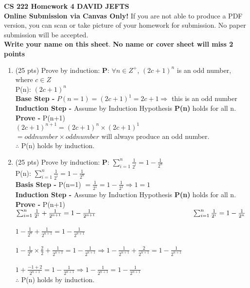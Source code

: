 \documentclass[11pt]{article}
\newcommand\tab[1][1cm]{\hspace*{#1}}
\begin{document}
{\Large {\bf CS 222 Homework 4   \tab\tab\tab\tab DAVID JEFTS}}\\

\noindent \textbf{Online Submission via Canvas Only!} If you are not able to produce a PDF version, you can scan or take picture of your homework for submission. No paper submission will be accepted.\\

\noindent \textbf{Write your name on this sheet}. \textbf{No name or cover sheet will miss 2 points}

\begin{enumerate}
  \item (25 pts) Prove by induction: {\bf P}: $\forall n \in Z^+$, $(2c+1)^n$ is an odd number, where $c \in Z$ \\
    \tab P(n): $(2c+1)^n$ \\
    \tab \textbf{Base Step -} $P(n=1) = (2c+1)^1 = 2c+1 \Rightarrow$ this is an odd number\\
    \tab \textbf{Induction Step -} Assume by Induction Hypothesis \textbf{P(n)} holds for all n.\\
    \tab \textbf{Prove -}  P(n+1) \\
    \tab\tab $(2c+1)^{n+1} = (2c+1)^n\times(2c+1)^1 $ \\
    \tab\tab $= {odd number} \times {odd number} $ will always produce an odd number. \\
    \tab\tab\tab$\therefore$ P(n) holds by induction. {\Large\checkmark} \\
    
  \item (25 pts) Prove by induction: {\bf P}: $\sum_{i=1}^n\frac{1}{2^i}=1-\frac{1}{2^n} $ \\
  \tab P(n): $\sum_{i=1}^{n}\frac{1}{2^i} = 1-\frac{1}{2^n} $ \\
  \tab \textbf{Basis Step -} P(n=1) $= \frac{1}{2^1} = 1 - \frac{1}{2^1} \Rightarrow 1=1 $ \\
  \tab \textbf{Induction Step -} Assume by Induction Hypothesis \textbf{P(n)} holds for all n. \\
  \tab \textbf{Prove -} P(n+1) \\
  \tab\tab $ \sum_{i=1}^{n}\frac{1}{2^i}+\frac{1}{2^{n+1}} = 1 - \frac{1}{2^{n+1}} \tab\tab\tab\tab\tab \sum_{i=1}^{n}\frac{1}{2^i} = 1-\frac{1}{2^n} $ \\\\
  \tab\tab $ 1-\frac{1}{2^n} + \frac{1}{2^{n+1}} = 1 - \frac{1}{2^{n+1}} $ \\\\
  \tab\tab $ 1-\frac{1}{2^n}\times\frac{2}{2} + \frac{1}{2^{n+1}} = 1 - \frac{1}{2^{n+1}} \Rightarrow 1-\frac{1}{2^{n+1}} + \frac{2}{2^{n+1}} = 1 - \frac{1}{2^{n+1}} $ \\\\
  \tab\tab $ 1+\frac{-1+2}{2^{n+1}} = 1 - \frac{1}{2^{n+1}} \Rightarrow 1 - \frac{1}{2^{n+1}}=1 - \frac{1}{2^{n+1}} $ \\
  \tab\tab\tab$\therefore$ P(n) holds by induction. {\Large\checkmark}\\\\
  


\end{enumerate}
\end{document}

